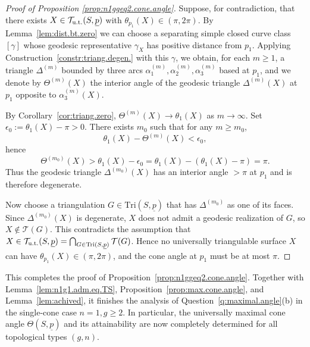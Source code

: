 \documentclass[11pt, letterpaper]{amsart}
\theoremstyle{definition}
\theoremstyle{remark}
\newcommand{\up}{\underline{p}}
\newcommand{\Sp}{(S,\up)}
\newcommand{\TSp}{\text{Tri}\Sp}
\newcommand{\cT}{\mathcal{T}}
\numberwithin{equation}{section}
\begin{document}
\begin{proof}[Proof of Proposition \ref{prop:n1ggeq2.cone.angle}]
Suppose, for contradiction, that there exists
\(X\in\cT_{\rm u.t.}(S,\underline{p})\) with
\(\theta_{p_1}(X)\in (\pi,2\pi)\).
By Lemma~\ref{lem:dist.bt.zero} we can choose a separating simple closed
curve class \([\gamma]\) whose geodesic representative \(\gamma_X\) has
positive distance from \(p_1\).
Applying Construction~\ref{constr:triang.degen.} with this \(\gamma\), we
obtain, for each \(m\ge 1\), a triangle \(\Delta^{(m)}\) bounded by three
arcs \(\alpha^{(m)}_1,\alpha^{(m)}_2,\alpha^{(m)}_3\) based at \(p_1\), and
we denote by \(\Theta^{(m)}(X)\) the interior angle of the geodesic
triangle \(\Delta^{(m)}(X)\) at \(p_1\) opposite to \(\alpha^{(m)}_3(X)\).

By Corollary~\ref{cor:triang.zero},
\(\Theta^{(m)}(X)\to\theta_1(X)\) as \(m\to\infty\).
Set \(\epsilon_0 := \theta_1(X)-\pi > 0\).
There exists \(m_0\) such that for any $m\geq m_0$, 
\[
\theta_1(X) - \Theta^{(m)}(X) < \epsilon_0,
\]
hence
\[
\Theta^{(m_0)}(X)
> \theta_1(X) - \epsilon_0
= \theta_1(X) - (\theta_1(X)-\pi)
= \pi.
\]
Thus the geodesic triangle \(\Delta^{(m_0)}(X)\) has an interior angle
\(> \pi\) at \(p_1\) and is therefore degenerate.

Now choose a triangulation \(G\in\TSp\) that has \(\Delta^{(m_0)}\) as one
of its faces.  Since \(\Delta^{(m_0)}(X)\) is degenerate, $X$ does not admit a geodesic realization of $G$, so \(X\notin\cT(G)\).  This contradicts the assumption that
\(X\in\cT_{\rm u.t.}(S,\underline{p}) = \bigcap_{G\in\TSp}\cT(G)\).
Hence no universally triangulable surface \(X\) can have
\(\theta_{p_1}(X) \in (\pi,2\pi)\), and the cone angle at \(p_1\) must be
at most \(\pi\).
\end{proof}

This completes the proof of Proposition~\ref{prop:n1ggeq2.cone.angle}.
Together with Lemma~\ref{lem:n1g1.adm.eq.TS},
Proposition~\ref{prop:max.cone.angle}, and Lemma~\ref{lem:achived}, it
finishes the analysis of Question~\ref{q:maximal.angle}(b) in the single-cone
case \(n=1, g\ge 2\).
In particular, the universally maximal cone angle \(\Theta(S,\underline{p})\)
and its attainability are now completely determined for all topological
types \((g,n)\).

 
\printbibliography
\end{document}

